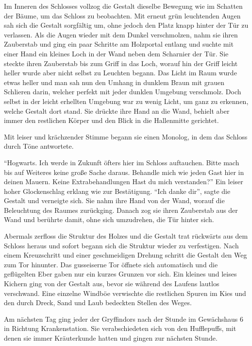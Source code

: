 Im Inneren des Schlosses vollzog die Gestalt dieselbe Bewegung wie im Schatten der Bäume, um das Schloss zu beobachten. Mit erneut grün leuchtenden Augen sah sich die Gestalt sorgfältig um, ohne jedoch den Platz knapp hinter der Tür zu verlassen. Als die Augen wieder mit dem Dunkel verschmolzen, nahm sie ihren Zauberstab und ging ein paar Schritte am Holzportal entlang und suchte mit einer Hand ein kleines Loch in der Wand neben dem Scharnier der Tür. Sie steckte ihren Zauberstab bis zum Griff in das Loch, worauf hin der Griff leicht heller wurde aber nicht selbst zu Leuchten begann. Das Licht im Raum wurde etwas heller und man sah nun den Umhang in dunklem Braun mit grauen Schlieren darin, welcher perfekt mit jeder dunklen Umgebung verschmolz. Doch selbst in der leicht erhellten Umgebung war zu wenig Licht, um ganz zu erkennen, welche Gestalt dort stand. Sie drückte ihre Hand an die Wand, behielt aber immer den restlichen Körper und den Blick in die Hallenmitte gerichtet.

Mit leiser und krächzender Stimme begann sie einen Monolog, in dem das Schloss durch Töne antwortete.

\enquote{Hogwarts. Ich werde in Zukunft öfters hier im Schloss auftauchen. Bitte mach bis auf Weiteres keine große Sache daraus. Behandle mich wie jeden Gast hier in deinen Mauern. Keine Extrabehandlungen \gst Hast du mich verstanden?} Ein leiser hoher Glockenschlag erklang wie zur Bestätigung. \enquote{Ich danke dir}, sagte die Gestalt und verneigte sich. Sie nahm ihre Hand von der Wand, worauf die Beleuchtung des Raumes zurückging. Danach zog sie ihren Zauberstab aus der Wand und berührte damit, ohne sich umzudrehen, die Tür hinter sich.

Abermals zerfloss die Struktur des Holzes und die Gestalt trat rückwärts aus dem Schloss heraus und sofort begann sich die Struktur wieder zu verfestigen. Nach einem Kreuzschritt und einer geschmeidigen Drehung schritt die Gestalt den Weg zum Tor hinunter. Das gusseiserne Tor öffnete sich automatisch und die geflügelten Eber gaben nur ein kurzes Grunzen vor sich. Ein kleines und leises Kichern ging von der Gestalt aus, bevor sie während des Laufens lautlos verschwand. Eine einzelne Windböe verwischte die restlichen Spuren im Kies und den durch Dreck, Sand und Laub bedeckten Stellen des Weges.

\trenn

Am nächsten Tag ging jeder der Gryffindors nach der Stunde im Gewächshaus 6 in Richtung Krankenstation. Sie verabschiedeten sich von den Hufflepuffs, mit denen sie immer Kräuterkunde hatten und gingen zur nächsten Stunde.

